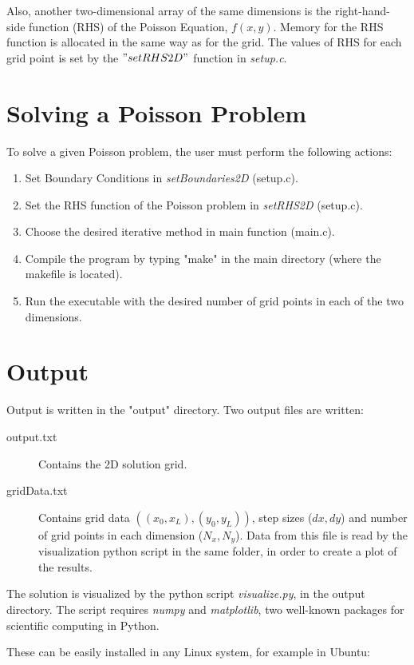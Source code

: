 \documentclass[11pt]{report}
\begin{document}
Also, another two-dimensional array of the same dimensions is the right-hand-side function (RHS) of the Poisson Equation, $f(x,y)$. Memory for the RHS function is allocated in the same way as for the grid. The values of RHS for each grid point is set by the $"setRHS2D"$ function in \emph{setup.c}.

\section{Solving a Poisson Problem}
To solve a given Poisson problem, the user must perform the following actions:

\begin{enumerate}
  \item Set Boundary Conditions in \emph{setBoundaries2D} (setup.c).
  \item Set the RHS function of the Poisson problem in \emph{setRHS2D} (setup.c).
  \item Choose the desired iterative method in main function (main.c).
  \item Compile the program by typing "make" in the main directory (where the makefile is located).
  \item Run the executable with the desired number of grid points in each of the two dimensions.
\end{enumerate}

\section{Output}
Output is written in the "output" directory. Two output files are written:

\begin{description}
  \item[output.txt] Contains the 2D solution grid.
  \item[gridData.txt] Contains grid data $\left( (x_0, x_L), (y_0, y_L) \right) $, step sizes ($dx, dy$) and number of grid points in each dimension ($N_x, N_y$). Data from this file is read by the visualization python script in the same folder, in order to create a plot of the results.
\end{description}

The solution is visualized by the python script \emph{visualize.py}, in the output directory.
The script requires \emph{numpy} and \emph{matplotlib}, two well-known packages for scientific computing in Python.

These can be easily installed in any Linux system, for example in Ubuntu:
\end{document}
